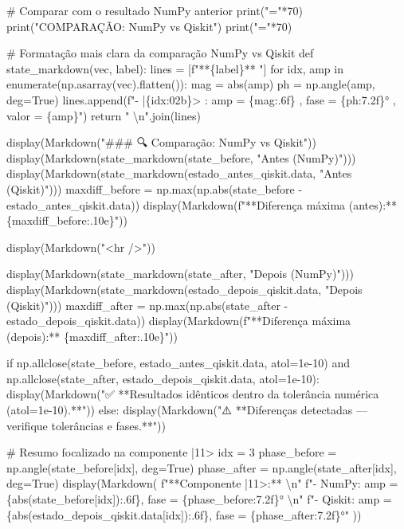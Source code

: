 \documentclass[
  brazilian,
]{report}
\newenvironment{Shaded}{\begin{snugshade}}{\end{snugshade}}
\newcommand{\NormalTok}[1]{\textcolor[rgb]{0.00,0.23,0.31}{#1}}
\begin{document}
\begin{Shaded}
\begin{Highlighting}[]

\NormalTok{\# Comparar com o resultado NumPy anterior}
\NormalTok{print("="*70)}
\NormalTok{print("COMPARAÇÃO: NumPy vs Qiskit")}
\NormalTok{print("="*70)}

\NormalTok{\# Formatação mais clara da comparação NumPy vs Qiskit}
\NormalTok{def state\_markdown(vec, label):}
\NormalTok{    lines = [f"**\{label\}**  "]}
\NormalTok{    for idx, amp in enumerate(np.asarray(vec).flatten()):}
\NormalTok{        mag = abs(amp)}
\NormalTok{        ph = np.angle(amp, deg=True)}
\NormalTok{        lines.append(f"{-} |\{idx:02b\}\textgreater{} : amp = \{mag:.6f\} , fase = \{ph:7.2f\}° , valor = \{amp\}")}
\NormalTok{    return "  \textbackslash{}n".join(lines)}

\NormalTok{display(Markdown("\#\#\# 🔍 Comparação: NumPy vs Qiskit"))}
\NormalTok{display(Markdown(state\_markdown(state\_before, "Antes (NumPy)")))}
\NormalTok{display(Markdown(state\_markdown(estado\_antes\_qiskit.data, "Antes (Qiskit)")))}
\NormalTok{maxdiff\_before = np.max(np.abs(state\_before {-} estado\_antes\_qiskit.data))}
\NormalTok{display(Markdown(f"**Diferença máxima (antes):** \{maxdiff\_before:.10e\}"))}

\NormalTok{display(Markdown("\textless{}hr /\textgreater{}"))}

\NormalTok{display(Markdown(state\_markdown(state\_after, "Depois (NumPy)")))}
\NormalTok{display(Markdown(state\_markdown(estado\_depois\_qiskit.data, "Depois (Qiskit)")))}
\NormalTok{maxdiff\_after = np.max(np.abs(state\_after {-} estado\_depois\_qiskit.data))}
\NormalTok{display(Markdown(f"**Diferença máxima (depois):** \{maxdiff\_after:.10e\}"))}

\NormalTok{if np.allclose(state\_before, estado\_antes\_qiskit.data, atol=1e{-}10) and np.allclose(state\_after, estado\_depois\_qiskit.data, atol=1e{-}10):}
\NormalTok{    display(Markdown("✅ **Resultados idênticos dentro da tolerância numérica (atol=1e{-}10).**"))}
\NormalTok{else:}
\NormalTok{    display(Markdown("⚠️ **Diferenças detectadas — verifique tolerâncias e fases.**"))}

\NormalTok{\# Resumo focalizado na componente |11\textgreater{}}
\NormalTok{idx = 3}
\NormalTok{phase\_before = np.angle(state\_before[idx], deg=True)}
\NormalTok{phase\_after = np.angle(state\_after[idx], deg=True)}
\NormalTok{display(Markdown(}
\NormalTok{    f"**Componente |11\textgreater{}:**  \textbackslash{}n"}
\NormalTok{    f"{-} NumPy: amp = \{abs(state\_before[idx]):.6f\}, fase = \{phase\_before:7.2f\}°  \textbackslash{}n"}
\NormalTok{    f"{-} Qiskit: amp = \{abs(estado\_depois\_qiskit.data[idx]):.6f\}, fase = \{phase\_after:7.2f\}°"}
\NormalTok{))}
\end{Highlighting}
\end{Shaded}
\end{document}

